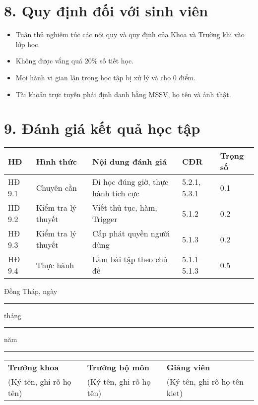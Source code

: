 \documentclass[a4paper,13pt]{article}
\begin{document}
\section*{8. Quy định đối với sinh viên}
\begin{itemize}
    \item Tuân thủ nghiêm túc các nội quy và quy định của Khoa và Trường khi vào lớp học.
    \item Không được vắng quá 20\% số tiết học.
    \item Mọi hành vi gian lận trong học tập bị xử lý và cho 0 điểm.
    \item Tài khoản trực tuyến phải định danh bằng MSSV, họ tên và ảnh thật.
\end{itemize}

\section*{9. Đánh giá kết quả học tập}
\begin{longtable}{|p{2cm}|p{3cm}|p{5cm}|p{2cm}|p{1.5cm}|}
\hline
\textbf{HĐ} & \textbf{Hình thức} & \textbf{Nội dung đánh giá} & \textbf{CĐR} & \textbf{Trọng số} \\
\hline
HĐ 9.1 & Chuyên cần & Đi học đúng giờ, thực hành tích cực & 5.2.1, 5.3.1 & 0.1 \\
\hline
HĐ 9.2 & Kiểm tra lý thuyết & Viết thủ tục, hàm, Trigger & 5.1.2 & 0.2 \\
\hline
HĐ 9.3 & Kiểm tra lý thuyết & Cấp phát quyền người dùng & 5.1.3 & 0.2 \\
\hline
HĐ 9.4 & Thực hành & Làm bài tập theo chủ đề & 5.1.1–5.1.3 & 0.5 \\
\hline
\end{longtable}

\vspace{2em}
\begin{flushright}
    Đồng Tháp, ngày \rule{1cm}{0.2pt} tháng \rule{1cm}{0.2pt} năm \rule{1.5cm}{0.2pt}
\end{flushright}

\begin{center}
    \begin{tabular}{>{\centering\arraybackslash}p{5cm} >{\centering\arraybackslash}p{5cm} >{\centering\arraybackslash}p{5cm}}
        \textbf{Trưởng khoa} & \textbf{Trưởng bộ môn} & \textbf{Giảng viên} \\
        (Ký tên, ghi rõ họ tên) & (Ký tên, ghi rõ họ tên) & (Ký tên, ghi rõ họ tên kiet) \\
    \end{tabular}
\end{center}
\end{document}

